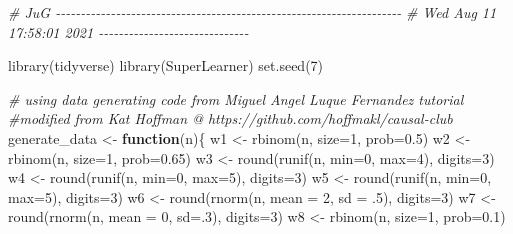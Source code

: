 \documentclass[
]{article}
\newenvironment{Shaded}{\begin{snugshade}}{\end{snugshade}}
\newcommand{\AttributeTok}[1]{\textcolor[rgb]{0.77,0.63,0.00}{#1}}
\newcommand{\CommentTok}[1]{\textcolor[rgb]{0.56,0.35,0.01}{\textit{#1}}}
\newcommand{\ControlFlowTok}[1]{\textcolor[rgb]{0.13,0.29,0.53}{\textbf{#1}}}
\newcommand{\DecValTok}[1]{\textcolor[rgb]{0.00,0.00,0.81}{#1}}
\newcommand{\FloatTok}[1]{\textcolor[rgb]{0.00,0.00,0.81}{#1}}
\newcommand{\FunctionTok}[1]{\textcolor[rgb]{0.00,0.00,0.00}{#1}}
\newcommand{\NormalTok}[1]{#1}
\newcommand{\OtherTok}[1]{\textcolor[rgb]{0.56,0.35,0.01}{#1}}
\begin{document}
\begin{Shaded}
\begin{Highlighting}[]
\CommentTok{\# JuG {-}{-}{-}{-}{-}{-}{-}{-}{-}{-}{-}{-}{-}{-}{-}{-}{-}{-}{-}{-}{-}{-}{-}{-}{-}{-}{-}{-}{-}{-}{-}{-}{-}{-}{-}{-}{-}{-}{-}{-}{-}{-}{-}{-}{-}{-}{-}{-}{-}{-}{-}{-}{-}{-}{-}{-}{-}{-}{-}{-}{-}{-}{-}{-}{-}{-}{-}{-}{-}}
\CommentTok{\# Wed Aug 11 17:58:01 2021 {-}{-}{-}{-}{-}{-}{-}{-}{-}{-}{-}{-}{-}{-}{-}{-}{-}{-}{-}{-}{-}{-}{-}{-}{-}{-}{-}{-}{-}{-}}

\FunctionTok{library}\NormalTok{(tidyverse)}
\FunctionTok{library}\NormalTok{(SuperLearner)}
\FunctionTok{set.seed}\NormalTok{(}\DecValTok{7}\NormalTok{)}

\CommentTok{\# using data generating code from Miguel Angel Luque Fernandez\textquotesingle{} tutorial}
\CommentTok{\#modified from Kat Hoffman @ https://github.com/hoffmakl/causal{-}club}
\NormalTok{generate\_data }\OtherTok{\textless{}{-}} \ControlFlowTok{function}\NormalTok{(n)\{}
\NormalTok{  w1 }\OtherTok{\textless{}{-}} \FunctionTok{rbinom}\NormalTok{(n, }\AttributeTok{size=}\DecValTok{1}\NormalTok{, }\AttributeTok{prob=}\FloatTok{0.5}\NormalTok{)}
\NormalTok{  w2 }\OtherTok{\textless{}{-}} \FunctionTok{rbinom}\NormalTok{(n, }\AttributeTok{size=}\DecValTok{1}\NormalTok{, }\AttributeTok{prob=}\FloatTok{0.65}\NormalTok{)}
\NormalTok{  w3 }\OtherTok{\textless{}{-}} \FunctionTok{round}\NormalTok{(}\FunctionTok{runif}\NormalTok{(n, }\AttributeTok{min=}\DecValTok{0}\NormalTok{, }\AttributeTok{max=}\DecValTok{4}\NormalTok{), }\AttributeTok{digits=}\DecValTok{3}\NormalTok{)}
\NormalTok{  w4 }\OtherTok{\textless{}{-}} \FunctionTok{round}\NormalTok{(}\FunctionTok{runif}\NormalTok{(n, }\AttributeTok{min=}\DecValTok{0}\NormalTok{, }\AttributeTok{max=}\DecValTok{5}\NormalTok{), }\AttributeTok{digits=}\DecValTok{3}\NormalTok{)}
\NormalTok{  w5 }\OtherTok{\textless{}{-}} \FunctionTok{round}\NormalTok{(}\FunctionTok{runif}\NormalTok{(n, }\AttributeTok{min=}\DecValTok{0}\NormalTok{, }\AttributeTok{max=}\DecValTok{5}\NormalTok{), }\AttributeTok{digits=}\DecValTok{3}\NormalTok{)}
\NormalTok{  w6 }\OtherTok{\textless{}{-}} \FunctionTok{round}\NormalTok{(}\FunctionTok{rnorm}\NormalTok{(n, }\AttributeTok{mean =} \DecValTok{2}\NormalTok{, }\AttributeTok{sd =}\NormalTok{ .}\DecValTok{5}\NormalTok{), }\AttributeTok{digits=}\DecValTok{3}\NormalTok{)}
\NormalTok{  w7 }\OtherTok{\textless{}{-}} \FunctionTok{round}\NormalTok{(}\FunctionTok{rnorm}\NormalTok{(n, }\AttributeTok{mean =} \DecValTok{0}\NormalTok{, }\AttributeTok{sd=}\NormalTok{.}\DecValTok{3}\NormalTok{), }\AttributeTok{digits=}\DecValTok{3}\NormalTok{)}
\NormalTok{  w8 }\OtherTok{\textless{}{-}} \FunctionTok{rbinom}\NormalTok{(n, }\AttributeTok{size=}\DecValTok{1}\NormalTok{, }\AttributeTok{prob=}\FloatTok{0.1}\NormalTok{)}
  

\end{Highlighting}
\end{Shaded}
\end{document}
